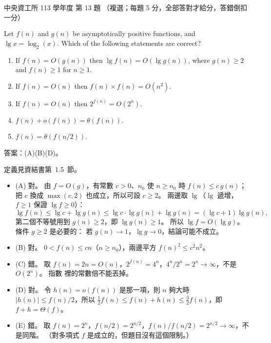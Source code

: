 \begin{pastexam}[label={px:ncu-113-dsa-13}]{中央資工所 113 學年度 第 13 題}
（複選；每題 5 分，全部答對才給分，答錯倒扣一分）

Let $f(n)$ and $g(n)$ be asymptotically positive functions, and $\lg x=\log_2(x)$. Which of the following
statements are correct?
\begin{enumerate}[label=(\Alph*)]
\item If $f(n)=O(g(n))$ then $\lg f(n)=O(\lg g(n))$, where $g(n)\ge 2$ and $f(n)\ge 1$ for $n\ge 1$.
\item If $f(n)=O(n)$ then $f(n)\times f(n)=O(n^2)$.
\item If $f(n)=O(n)$ then $2^{f(n)}=O(2^n)$.
\item $f(n)+o(f(n))=\theta(f(n))$.
\item $f(n)=\theta(f(n/2))$.
\end{enumerate}
\end{pastexam}

\begin{pastsoln}
答案：(A)(B)(D)。

定義見資結書第~1.5~節。
\begin{itemize}
\item (A) 對。 由 $f = O(g)$，有常數 $c > 0$、$n_0$ 使 $n \ge n_0$ 時 $f(n) \le c\,g(n)$；把 $c$ 換成
$\max(c, 2)$ 也成立，所以可設 $c \ge 2$。 兩邊取 $\lg$（$\lg$ 遞增，$f \ge 1$ 保證 $\lg f \ge 0$）：
\[
\lg f(n) \le \lg c + \lg g(n) \le \lg c \cdot \lg g(n) + \lg g(n) = (\lg c + 1)\lg g(n),
\]
第二個不等號用到 $g(n) \ge 2$，即 $\lg g(n) \ge 1$。 所以 $\lg f = O(\lg g)$。 條件 $g \ge 2$ 是必要的：
若 $g(n) \to 1$，$\lg g \to 0$，結論可能不成立。
\item (B) 對。 $0 < f(n) \le cn$（$n \ge n_0$），兩邊平方 $f(n)^2 \le c^2 n^2$。
\item (C) 錯。 取 $f(n) = 2n = O(n)$，$2^{f(n)} = 4^n$，$4^n / 2^n = 2^n \to \infty$，不是 $O(2^n)$。 指數
裡的常數倍不能丟掉。
\item (D) 對。 令 $h(n) = o(f(n))$ 是那一項，則 $n$ 夠大時 $|h(n)| \le f(n)/2$，所以
$\tfrac12 f(n) \le f(n) + h(n) \le \tfrac32 f(n)$，即 $f + h = \Theta(f)$。
\item (E) 錯。 取 $f(n) = 2^n$，$f(n/2) = 2^{n/2}$，$f(n)/f(n/2) = 2^{n/2} \to \infty$，不是同階。
（對多項式 $f$ 是成立的，但題目沒有這個限制。）
\end{itemize}
\end{pastsoln}
